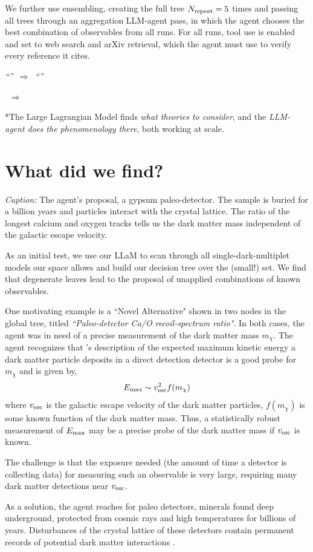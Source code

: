\documentclass[11pt]{article}
\makeatletter
\newcommand{\figplace}[3][]{%
  \begin{tcolorbox}[colback=blue!4,colframe=blue!40!black,
                    title={Figure: \texttt{#2}\ifx\relax#1\relax\else\ (#1)\fi}]
  \emph{Caption:} #3
  \end{tcolorbox}}
\newcommand{\pullquote}{\@ifstar\pq@bare\pq@quoted}
\newcommand{\pq@quoted}[2][]{%
  \begin{center}\itshape\large
  ``#2''\ifx\relax#1\relax\else\ $\Rightarrow$\ ``#1''\fi
  \end{center}}
\newcommand{\pq@bare}[2][]{%
  \begin{center}\itshape\large
  #2\ifx\relax#1\relax\else\ $\Rightarrow$\ #1\fi
  \end{center}}
\makeatother
\begin{document}
We further use ensembling, creating the full tree $N_{\rm repeat} = 5$ times and passing all trees through an aggregation LLM-agent pass, in which the agent chooses the best combination of observables from all runs. For all runs, tool use is enabled and set to web search and arXiv retrieval, which the agent must use to verify every reference it cites. 


\pullquote*{The Large Lagrangian Model finds \emph{what theories to consider}, and the \emph{LLM-agent does the phenomenology there}, both working at scale.}

\section{What did we find?}
\figplace[wide]{paleo-detector}{The agent's proposal, a gypsum paleo-detector. The
sample is buried for a billion years and particles interact with the crystal lattice. The ratio of the longest calcium and oxygen tracks tells us the
dark matter mass independent of the galactic escape velocity.}
As an initial test, we use our LLaM to scan through all single-dark-multiplet models our space allows and build our decision tree over the (small!) set. We find that degenerate leaves lead to the proposal of unapplied combinations of known observables.

One motivating example is a ``Novel Alternative" shown in two nodes in the global tree, titled \textit{``Paleo-detector Ca/O recoil-spectrum ratio"}. In both cases, the agent was in need of a precise measurement of the dark matter mass $m_\chi$.  The agent recognizes that \cite{Drees:2008bv}'s description of the expected maximum kinetic energy a dark matter particle deposits in a direct detection detector is a good probe for $m_\chi$ and is given by,
\begin{equation}
E_{\rm max} \sim v^2_{\rm esc} f(m_\chi)
\end{equation}
where $v_{\rm esc}$ is the galactic escape velocity of the dark matter particles, $ f(m_\chi)$ is some known function of the dark matter mass. Thus, a statistically robust measurement of $E_{\rm max}$ may be a precise probe of the dark matter mass if $v_{\rm esc}$ is known.

The challenge is that the exposure needed (the amount of time a detector is collecting data) for measuring such an observable is very large, requiring many dark matter detections near $v_{\rm esc}$.

As a solution, the agent reaches for paleo detectors, minerals found deep underground, protected from cosmic rays and high temperatures for billions of years. Disturbances of the crystal lattice of these detectors contain permanent records of potential dark matter interactions \cite{Baum:2018tfw,Baum:2023cct,Baum:2021jak,Edwards:2018hcf,Drukier:2018pdy}.
\end{document}

